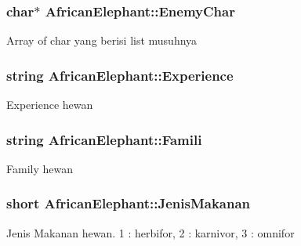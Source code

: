\subsubsection[{\texorpdfstring{Enemy\+Char}{EnemyChar}}]{\setlength{\rightskip}{0pt plus 5cm}char$\ast$ African\+Elephant\+::\+Enemy\+Char\hspace{0.3cm}{\ttfamily [protected]}}\hypertarget{class_african_elephant_ae92db5a99916b43f0c31e7a118c004b6}{}\label{class_african_elephant_ae92db5a99916b43f0c31e7a118c004b6}
Array of char yang berisi list musuhnya 
\subsubsection[{\texorpdfstring{Experience}{Experience}}]{\setlength{\rightskip}{0pt plus 5cm}string African\+Elephant\+::\+Experience\hspace{0.3cm}{\ttfamily [protected]}}\hypertarget{class_african_elephant_ae829d108093e48e59f7a5c35763155a3}{}\label{class_african_elephant_ae829d108093e48e59f7a5c35763155a3}
Experience hewan 
\subsubsection[{\texorpdfstring{Famili}{Famili}}]{\setlength{\rightskip}{0pt plus 5cm}string African\+Elephant\+::\+Famili\hspace{0.3cm}{\ttfamily [protected]}}\hypertarget{class_african_elephant_aa7e6a696ec153e20b074f5173bdd3774}{}\label{class_african_elephant_aa7e6a696ec153e20b074f5173bdd3774}
Family hewan 
\subsubsection[{\texorpdfstring{Jenis\+Makanan}{JenisMakanan}}]{\setlength{\rightskip}{0pt plus 5cm}short African\+Elephant\+::\+Jenis\+Makanan\hspace{0.3cm}{\ttfamily [protected]}}\hypertarget{class_african_elephant_a86efbbc4722a04c8baa3592e9f8c1d3b}{}\label{class_african_elephant_a86efbbc4722a04c8baa3592e9f8c1d3b}
Jenis Makanan hewan. 1 \+: herbifor, 2 \+: karnivor, 3 \+: omnifor 
